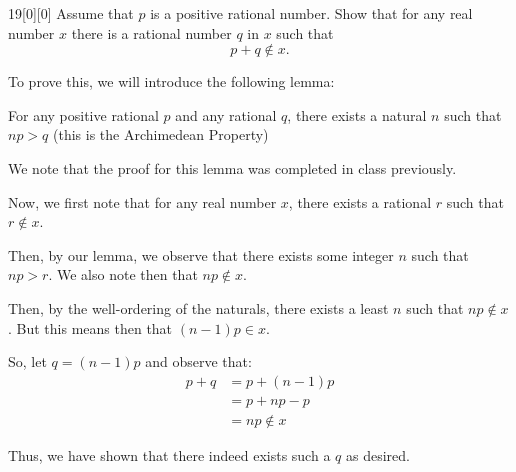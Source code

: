 \documentclass{article}
\begin{document}
\begin{hw}{19}[0][0]
	Assume that $p$ is a positive rational number. Show that for any real number $x$ there is a rational number $q$ in $x$ such that 
	\begin{equation*}
		p + q \not\in x.
	\end{equation*}
\end{hw}
\begin{solution}
	To prove this, we will introduce the following lemma:
	\begin{lem*}
		For any positive rational $p$ and any rational $q$, there exists a natural $n$ such that $np > q$ (this is the Archimedean Property)
	\end{lem*}
	\begin{innerproof}
		We note that the proof for this lemma was completed in class previously.
	\end{innerproof}
	
	Now, we first note that for any real number $x$, there exists a rational $r$ such that $r \not\in x$. 
	
	Then, by our lemma, we observe that there exists some integer $n$ such that $np > r$. We also note then that $np \not\in x$.
	
	Then, by the well-ordering of the naturals, there exists a least $n$ such that $np \not\in x$. But this means then that $(n-1)p \in x$.
	
	So, let $q = (n-1)p$ and observe that:
	\begin{align*}
		p + q &= p + (n-1)p \\
		&= p + np - p \\
		&= np \not\in x
	\end{align*}

	Thus, we have shown that there indeed exists such a $q$ as desired.
\end{solution}
\end{document}
